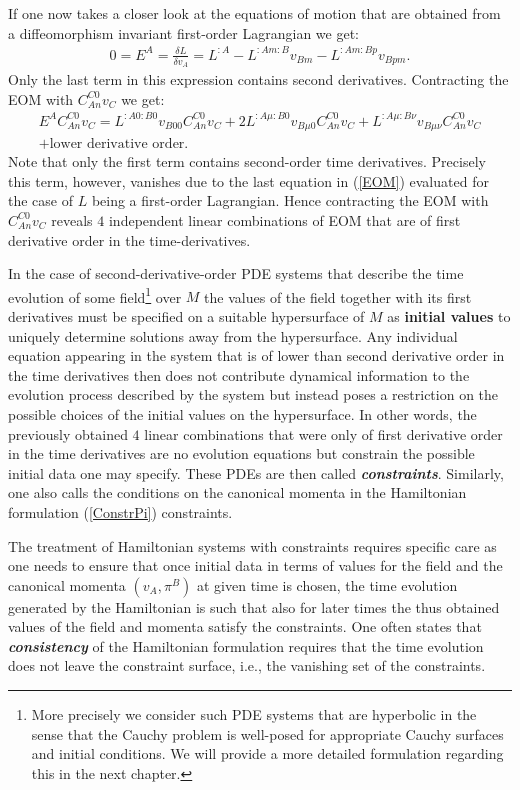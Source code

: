 If one now takes a closer look at the equations of motion that are obtained from a diffeomorphism invariant first-order Lagrangian we get:
\begin{align}
    0 = E^A = \frac{\delta L}{\delta v_A} = L^{:A} - L^{:Am:B} v_{Bm} - L^{:Am:Bp}v_{Bpm}.
\end{align}
Only the last term in this expression contains second derivatives.
Contracting the EOM with $C_{An}^{C0}v_C$ we get:
\begin{multline}
    E^A C_{An}^{C0}v_C = L^{:A0:B0}v_{B00}C_{An}^{C0}v_C + 2L^{:A\mu : B 0} v_{B\mu 0}C_{An}^{C0}v_C + L^{:A\mu : B \nu} v_{B\mu \nu}C_{An}^{C0}v_C\\
    + \text{lower derivative order}.
\end{multline}
Note that only the first term contains second-order time derivatives. Precisely this term, however, vanishes due to the last equation in (\ref{EOM}) evaluated for the case of $L$ being a first-order Lagrangian. Hence contracting the EOM with $C_{An}^{C0}v_C$ reveals $4$ independent linear combinations of EOM that are of first derivative order in the time-derivatives.

In the case of second-derivative-order PDE systems that describe the time evolution of some field\footnote{More precisely we consider such PDE systems that are hyperbolic in the sense that the Cauchy problem is well-posed for appropriate Cauchy surfaces and initial conditions. We will provide a more detailed formulation regarding this in the next chapter.} over $M$ the values of the field together with its first derivatives must be specified on a suitable hypersurface of $M$ as \textbf{\textbf{initial values}} to uniquely determine solutions away from the hypersurface. 
Any individual equation appearing in the system that is of lower than second derivative order in the time derivatives then does not contribute dynamical information to the evolution process described by the system but instead poses a restriction on the possible choices of the initial values on the hypersurface. In other words, the previously obtained $4$ linear combinations that were only of first derivative order in the time derivatives are no evolution equations but constrain the possible initial data one may specify. These PDEs are then called \textbf{\textit{constraints}}.
Similarly, one also calls the conditions on the canonical momenta in the Hamiltonian formulation (\ref{ConstrPi}) constraints.

The treatment of Hamiltonian systems with constraints requires specific care as one needs to ensure that once initial data in terms of values for the field and the canonical momenta $(v_A,\pi^B)$ at given time is chosen, the time evolution generated by the Hamiltonian is such that also for later times the thus obtained values of the field and momenta satisfy the constraints. One often states that \textbf{\textit{consistency}} of the Hamiltonian formulation requires that the time evolution does not leave the constraint surface, i.e., the vanishing set of the constraints.

